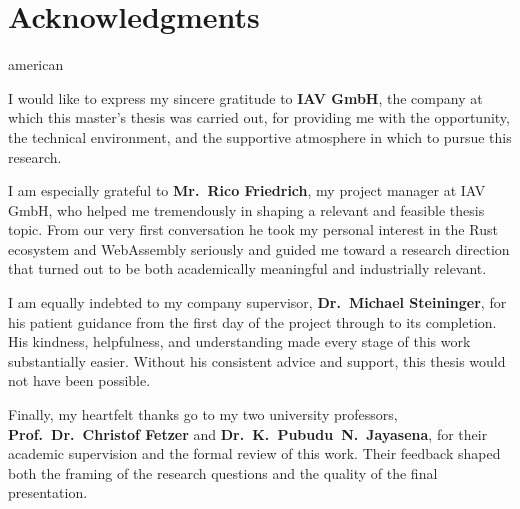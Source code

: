 \chapter*{Acknowledgments}
\begin{otherlanguage*}{american}

I would like to express my sincere gratitude to \textbf{IAV GmbH}, the company at which this master's thesis was carried out, for providing me with the opportunity, the technical environment, and the supportive atmosphere in which to pursue this research.

I am especially grateful to \textbf{Mr.~Rico Friedrich}, my project manager at IAV GmbH, who helped me tremendously in shaping a relevant and feasible thesis topic. From our very first conversation he took my personal interest in the Rust ecosystem and WebAssembly seriously and guided me toward a research direction that turned out to be both academically meaningful and industrially relevant.

I am equally indebted to my company supervisor, \textbf{Dr.~Michael Steininger}, for his patient guidance from the first day of the project through to its completion. His kindness, helpfulness, and understanding made every stage of this work substantially easier. Without his consistent advice and support, this thesis would not have been possible.

Finally, my heartfelt thanks go to my two university professors, \textbf{Prof.~Dr.~Christof Fetzer} and \textbf{Dr.~K.~Pubudu~N.~Jayasena}, for their academic supervision and the formal review of this work. Their feedback shaped both the framing of the research questions and the quality of the final presentation.

\end{otherlanguage*}
